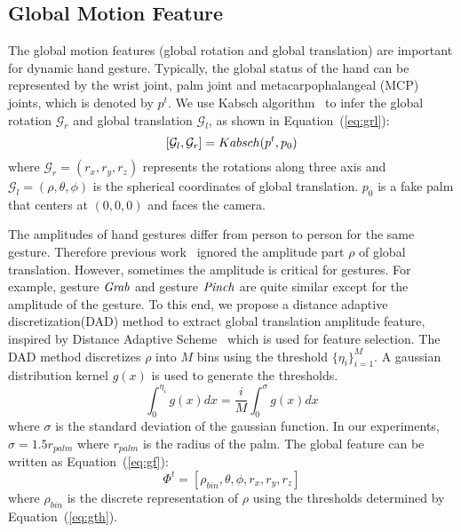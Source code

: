 \documentclass{article}
\begin{document}
\subsection{Global Motion Feature}
\label{sec:globalfeature}
The global motion features (global rotation and global translation) are important for dynamic hand gesture. Typically, the global status of the hand can be represented by the wrist joint, palm joint and metacarpophalangeal (MCP) joints, which is denoted by $p^t$. We use Kabsch algorithm~\cite{kabsch1976solution} to infer the global rotation $\mathcal{G}_r$ and global translation $\mathcal{G}_l$, as shown in Equation~(\ref{eq:grl}):
\begin{equation}
\label{eq:grl}
[\mathcal{G}_l, \mathcal{G}_r] = \mathnormal{Kabsch}(p^t, p_0)
\end{equation}
where $\mathcal{G}_r = (r_x, r_y, r_z)$ represents the rotations along three axis and $\mathcal{G}_l = (\rho, \theta, \phi)$ is the spherical coordinates of global translation. $p_0$ is a fake palm that centers at $(0,0,0)$ and faces the camera.

The amplitudes of hand gestures differ from person to person for the same gesture. Therefore previous work~\cite{de2016skeleton} ignored the amplitude part $\rho$ of global translation. However, sometimes the amplitude is critical for gestures. For example, gesture $\it{Grab}$ and gesture $\it{Pinch}$ are quite similar except for the amplitude of the gesture. To this end, we propose a distance adaptive discretization(DAD) method to extract global translation amplitude feature, inspired by Distance Adaptive Scheme~\cite{liang2014parsing, dong2015american} which is used for feature selection. The DAD method discretizes $\rho$ into $M$ bins using the threshold $\{\eta_{i}\}_{i=1}^M$. A gaussian distribution kernel $g(x)$ is used to generate the thresholds.
\begin{equation}
\label{eq:gth}
\int_0^{\eta_i} g(x) dx = \frac {i} {M}\int_0^{\sigma} g(x) dx
\end{equation}
where $\sigma$ is the standard deviation of the gaussian function. In our experiments, $\sigma=1.5r_{palm}$ where $r_{palm}$ is the radius of the palm. The global feature can be written as Equation~(\ref{eq:gf}):
\begin{equation}
\label{eq:gf}
\Phi^t = [\rho_{bin}, \theta, \phi, r_x, r_y, r_z]
\end{equation}
where $\rho_{bin}$ is the discrete representation of $\rho$ using the thresholds determined by Equation~(\ref{eq:gth}).
\end{document}
